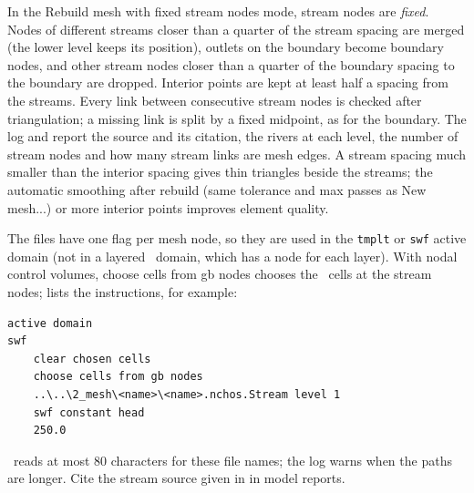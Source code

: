         In the {\sf Rebuild mesh with fixed stream nodes} mode, stream nodes are {\em fixed}.  Nodes of different streams closer than a quarter of the stream spacing are merged (the lower level keeps its position), outlets on the boundary become boundary nodes, and other stream nodes closer than a quarter of the boundary spacing to the boundary are dropped.  Interior points are kept at least half a spacing from the streams.  Every link between consecutive stream nodes is checked after triangulation; a missing link is split by a fixed midpoint, as for the boundary.  The log and  report the source and its citation, the rivers at each level, the number of stream nodes and how many stream links are mesh edges.  A stream spacing much smaller than the interior spacing gives thin triangles beside the streams; the automatic smoothing after rebuild (same tolerance and max passes as {\sf New mesh...}) or more interior points improves element quality.

        The  files have one flag per mesh node, so they are used in the {\tt tmplt} or {\tt swf} active domain (not in a layered \gwf\ domain, which has a node for each layer).  With {\sf nodal control volumes}, {\sf choose cells from gb nodes} chooses the \swf\ cells at the stream nodes;  lists the instructions, for example:
\begin{verbatim}
active domain
swf
    clear chosen cells
    choose cells from gb nodes
    ..\..\2_mesh\<name>\<name>.nchos.Stream level 1
    swf constant head
    250.0
\end{verbatim}
        \mut\ reads at most 80 characters for these file names; the log warns when the paths are longer.  Cite the stream source given in  in model reports.

